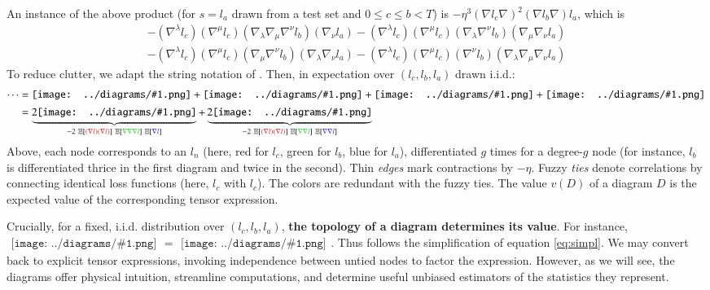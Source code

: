 \documentclass{article}
\newcommand{\expct}[1]{\mathbb{E}\left[#1\right]}
\newcommand{\sdia}[1]{\begin{gathered}\texttt{[image: ../diagrams/\#1.png]}\end{gathered}}
\begin{document}
        An instance of the above product (for $s=l_a$ drawn from a test set and
        $0\leq c\leq b<T$) is $-\eta^3 (\nabla l_c \nabla)^2 (\nabla l_b
        \nabla) l_a$, which is
        {\small
        \begin{align*}
            - (\nabla^\lambda l_c) (\nabla^\mu l_c) (\nabla_\lambda \nabla_\mu \nabla^\nu l_b) (\nabla_\nu l_a)   
            - (\nabla^\lambda l_c) (\nabla^\mu l_c) (\nabla_\lambda \nabla^\nu l_b) (\nabla_\mu \nabla_\nu l_a) \\
            - (\nabla^\lambda l_c) (\nabla^\mu l_c) (\nabla_\mu \nabla^\nu l_b) (\nabla_\lambda \nabla_\nu l_a)   
            - (\nabla^\lambda l_c) (\nabla^\mu l_c) (\nabla^\nu l_b) (\nabla_\lambda \nabla_\mu \nabla_\nu l_a)
        \end{align*}
        }
        To reduce clutter, we adapt the string notation of \citet{pe71}.  Then,
        in expectation over $(l_c, l_b, l_a)$ drawn i.i.d.:
        \begin{align}
            \cdots
            &= 
                 \sdia{(01-2-3)(02-12-23)}
                +\sdia{(01-2-3)(02-13-23)}
                +\sdia{(01-2-3)(03-12-23)}
                +\sdia{(01-2-3)(03-13-23)} \\
                \label{eq:simpl}
            &=
                \underbrace{2\sdia{(01-2-3)(02-12-23)}}_{
                   -2~\expct{{\color{moor}(\nabla l)(\nabla l)}}~\expct{{\color{moog}\nabla\nabla\nabla l}}~\expct{{\color{moob} \nabla l}}
                }
                +
                \underbrace{2\sdia{(01-2-3)(02-13-23)}}_{
                   -2~\expct{{\color{moor}(\nabla l)(\nabla l)}}~\expct{{\color{moog}\nabla \nabla l}}~\expct{{\color{moob}\nabla \nabla l}}
                }
        \end{align}
        Above, each node corresponds to an $l_n$ (here, red for $l_c$, green
        for $l_b$, blue for $l_a$), differentiated $g$ times for a degree-$g$
        node (for instance, $l_b$ is differentiated thrice in the first diagram
        and twice in the second).  Thin \emph{edges} mark contractions by
        $-\eta$.  Fuzzy \emph{ties} denote correlations by connecting identical
        loss functions (here, $l_c$ with $l_c$).  The colors are redundant with
        the fuzzy ties.  The value $v(D)$ of a diagram $D$ is the expected
        value of the corresponding tensor expression.
        
        Crucially, for a fixed, i.i.d.  distribution over $(l_c, l_b, l_a)$,
        {\bf the topology of a diagram determines its value}.  For instance,
        $\sdia{(01-2-3)(02-12-23)} = \sdia{(01-2-3)(03-13-23)}$.  Thus follows
        the simplification of equation \ref{eq:simpl}.  We may convert back to
        explicit tensor expressions, invoking independence between untied nodes
        to factor the expression.  However, as we will see, the diagrams offer
        physical intuition, streamline computations, and determine useful
        unbiased estimators of the statistics they represent.  
    
\end{document}
